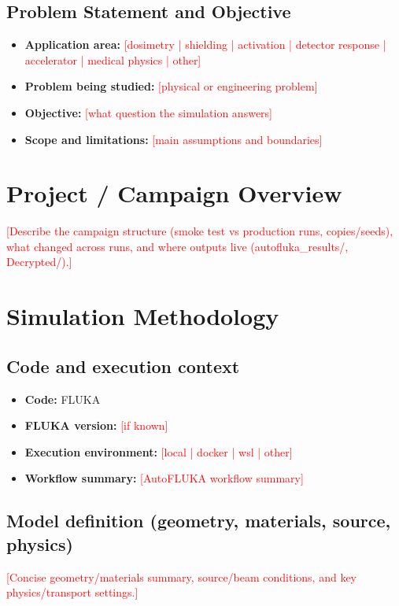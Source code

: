 \documentclass[11pt]{article}
\newcommand{\placeholder}[1]{\textcolor{red}{[#1]}}
\begin{document}
\subsection{Problem Statement and Objective}
\label{sec:problem_objective}
\begin{itemize}[leftmargin=1.5em]
  \item \textbf{Application area:} \placeholder{dosimetry | shielding | activation | detector response | accelerator | medical physics | other}
  \item \textbf{Problem being studied:} \placeholder{physical or engineering problem}
  \item \textbf{Objective:} \placeholder{what question the simulation answers}
  \item \textbf{Scope and limitations:} \placeholder{main assumptions and boundaries}
\end{itemize}

\section{Project / Campaign Overview}
\label{sec:campaign}
\placeholder{Describe the campaign structure (smoke test vs production runs, copies/seeds), what changed across runs, and where outputs live (autofluka\_results/, Decrypted/).}

\section{Simulation Methodology}
\label{sec:method}

\subsection{Code and execution context}
\begin{itemize}[leftmargin=1.5em]
  \item \textbf{Code:} FLUKA
  \item \textbf{FLUKA version:} \placeholder{if known}
  \item \textbf{Execution environment:} \placeholder{local | docker | wsl | other}
  \item \textbf{Workflow summary:} \placeholder{AutoFLUKA workflow summary}
\end{itemize}

\subsection{Model definition (geometry, materials, source, physics)}
\placeholder{Concise geometry/materials summary, source/beam conditions, and key physics/transport settings.}
\end{document}
